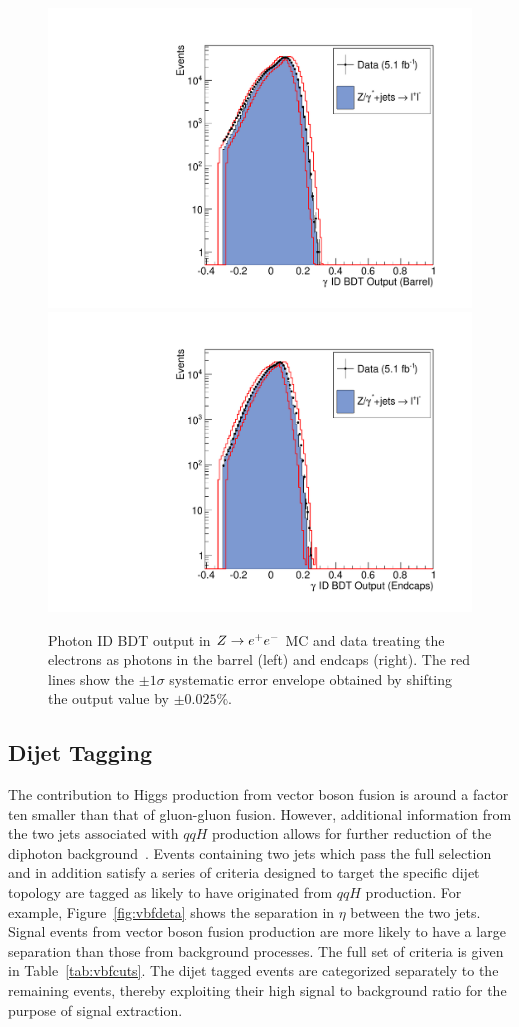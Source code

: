 \begin{figure}
  \includegraphics[width=.48\textwidth]{hgg7TeV/zeeValidation/phoID_EB.pdf}
  \includegraphics[width=.48\textwidth]{hgg7TeV/zeeValidation/phoID_EE.pdf}
\caption{Photon ID BDT output in $Z\rightarrow e^{+}e^{-}$ MC and data 
treating the electrons as photons in the barrel (left) and endcaps (right). 
The red lines show the $\pm 1\sigma$ systematic error envelope obtained by shifting the output value by $\pm 0.025\%$.}
\label{fig:zeevalidphoidmva}
\end{figure}

\subsection{Dijet Tagging}
\label{sec:dijettagging}

The contribution to Higgs production from vector boson fusion is around a factor ten smaller than that
of gluon-gluon fusion. However, additional information from the two jets associated 
with $qqH$ production allows for further reduction of the diphoton background~\citep{HIG-11-033}.
Events containing two jets which pass the full selection and in addition
satisfy a series of criteria designed to target the specific dijet topology are 
tagged as likely to have originated from $qqH$ production. For example, Figure~\ref{fig:vbfdeta} shows the 
separation in $\eta$ between the two jets. Signal events from vector boson fusion production are
more likely to have a large separation than those from background processes. The full set of 
criteria is given in Table~\ref{tab:vbfcuts}.
The dijet tagged events are categorized separately to 
the remaining events, thereby exploiting their high signal to background ratio for the purpose of signal
extraction. 

